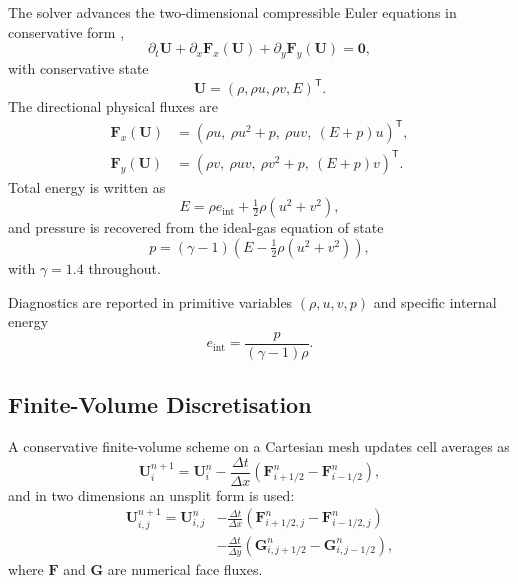 \documentclass[final,3p,times,twocolumn]{elsarticle}
\begin{document}
The solver advances the two-dimensional compressible Euler equations in conservative form \cite{toro2009},
\begin{equation}
\partial_t \mathbf{U} + \partial_x\mathbf{F}_x(\mathbf{U}) + \partial_y\mathbf{F}_y(\mathbf{U}) = \mathbf{0},
\end{equation}
with conservative state
\begin{equation}
\mathbf{U}=(\rho,\rho u,\rho v,E)^\mathsf{T}.
\end{equation}
The directional physical fluxes are
\begin{equation}
\begin{aligned}
\mathbf{F}_x(\mathbf{U}) &= (\rho u,\ \rho u^2+p,\ \rho u v,\ (E+p)u)^\mathsf{T},\\
\mathbf{F}_y(\mathbf{U}) &= (\rho v,\ \rho u v,\ \rho v^2+p,\ (E+p)v)^\mathsf{T}.
\end{aligned}
\end{equation}
Total energy is written as
\begin{equation}
E=\rho e_{\mathrm{int}}+\tfrac{1}{2}\rho(u^2+v^2),
\end{equation}
and pressure is recovered from the ideal-gas equation of state
\begin{equation}
p=(\gamma-1)\left(E-\tfrac{1}{2}\rho(u^2+v^2)\right),
\end{equation}
with $\gamma=1.4$ throughout.

Diagnostics are reported in primitive variables $(\rho,u,v,p)$ and specific internal energy
\begin{equation}
e_{\mathrm{int}}=\frac{p}{(\gamma-1)\rho}.
\end{equation}

\subsection{Finite-Volume Discretisation}

A conservative finite-volume scheme on a Cartesian mesh updates cell averages as
\begin{equation}
\mathbf{U}_i^{n+1}=\mathbf{U}_i^n-\frac{\Delta t}{\Delta x}\left(\mathbf{F}_{i+1/2}^n-\mathbf{F}_{i-1/2}^n\right),
\end{equation}
and in two dimensions an unsplit form is used:
\begin{equation}
\begin{aligned}
\mathbf{U}_{i,j}^{n+1}=\mathbf{U}_{i,j}^n
&-\frac{\Delta t}{\Delta x}\left(\mathbf{F}_{i+1/2,j}^n-\mathbf{F}_{i-1/2,j}^n\right)\\
&-\frac{\Delta t}{\Delta y}\left(\mathbf{G}_{i,j+1/2}^n-\mathbf{G}_{i,j-1/2}^n\right),
\end{aligned}
\end{equation}
where $\mathbf{F}$ and $\mathbf{G}$ are numerical face fluxes.
\end{document}
